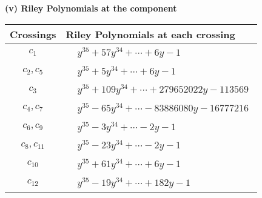 \documentclass[1p]{elsarticle_modified}
\theoremstyle{definition}
\begin{document}
\newpage\renewcommand{\arraystretch}{1}
\flushleft \textbf{(v) Riley Polynomials at the component}\newline \\
\begin{tabular}{m{50pt}|m{274pt}}
Crossings & \hspace{64pt}Riley Polynomials at each crossing \\
\hline $$\begin{aligned}c_{1}\end{aligned}$$&$\begin{aligned}
&y^{35}+57 y^{34}+\cdots+6 y-1
\end{aligned}$\\
\hline $$\begin{aligned}c_{2},c_{5}\end{aligned}$$&$\begin{aligned}
&y^{35}+5 y^{34}+\cdots+6 y-1
\end{aligned}$\\
\hline $$\begin{aligned}c_{3}\end{aligned}$$&$\begin{aligned}
&y^{35}+109 y^{34}+\cdots+279652022 y-113569
\end{aligned}$\\
\hline $$\begin{aligned}c_{4},c_{7}\end{aligned}$$&$\begin{aligned}
&y^{35}-65 y^{34}+\cdots-83886080 y-16777216
\end{aligned}$\\
\hline $$\begin{aligned}c_{6},c_{9}\end{aligned}$$&$\begin{aligned}
&y^{35}-3 y^{34}+\cdots-2 y-1
\end{aligned}$\\
\hline $$\begin{aligned}c_{8},c_{11}\end{aligned}$$&$\begin{aligned}
&y^{35}-23 y^{34}+\cdots-2 y-1
\end{aligned}$\\
\hline $$\begin{aligned}c_{10}\end{aligned}$$&$\begin{aligned}
&y^{35}+61 y^{34}+\cdots+6 y-1
\end{aligned}$\\
\hline $$\begin{aligned}c_{12}\end{aligned}$$&$\begin{aligned}
&y^{35}-19 y^{34}+\cdots+182 y-1
\end{aligned}$\\
\hline
\end{tabular}\\~\\
\end{document}

